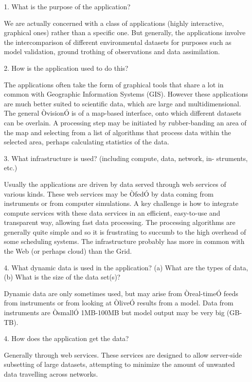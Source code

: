 \documentclass[preprint,12pt]{article}
\begin{document}
1.     What is the purpose of the application?

We are actually concerned with a class of applications (highly interactive, graphical ones) rather than a specific one.  But generally, the applications involve the intercomparison of different environmental datasets for purposes such as model validation, ground trothing of observations and data assimilation.

2.     How is the application used to do this?

The applications often take the form of graphical tools that share a lot in common with Geographic Information Systems (GIS). However these applications are much better suited to scientific data, which are large and multidimensional.  The general ÒvisionÓ is of a map-based interface, onto which different datasets can be overlain.  A processing step may be initiated by rubber-banding an area of the map and selecting from a list of algorithms that process data within the selected area, perhaps calculating statistics of the data.

3.     What infrastructure is used? (including compute, data, network, in- struments, etc.)

Usually the applications are driven by data served through web services of various kinds.  These web services may be ÒfedÓ by data coming from instruments or from computer simulations.  A key challenge is how to integrate compute services with these data services in an efficient, easy-to-use and transparent way, allowing fast data processing.  The processing algorithms are generally quite simple and so it is frustrating to succumb to the high overhead of some scheduling systems.  The infrastructure probably has more in common with the Web (or perhaps cloud) than the Grid.

     4. What dynamic data is used in the application?
(a) What are the types of data, (b) What is the size of the data set(s)?

Dynamic data are only sometimes used, but may arise from Òreal-timeÓ feeds from instruments or from looking at ÒliveÓ results from a model.  Data from instruments are ÒsmallÓ 1MB-100MB but model output may be very big (GB-TB).

4.     How does the application get the data?

Generally through web services.  These services are designed to allow server-side subsetting of large datasets, attempting to minimize the amount of unwanted data travelling across networks.
\end{document}
